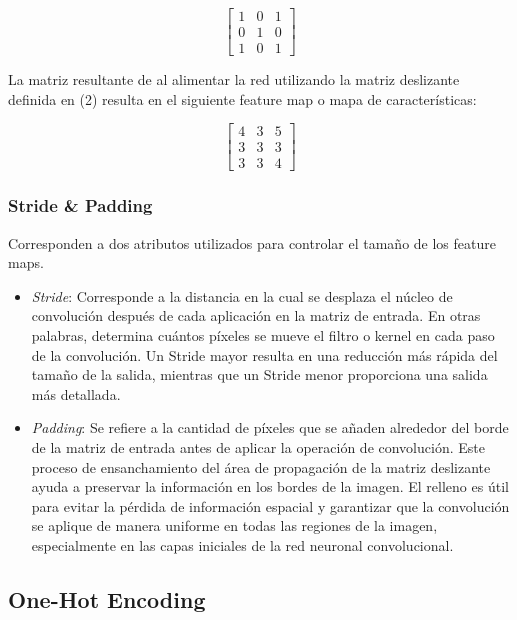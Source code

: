 \documentclass[journal]{IEEEtai}
\begin{document}
\begin{equation}
	\begin{bmatrix}
	1 & 0 & 1 \\
	0 & 1 & 0 \\
	1 & 0 & 1 
	\end{bmatrix}
\end{equation}

\hfill \break
La matriz resultante de al alimentar la red utilizando la matriz deslizante definida en (2) resulta en el siguiente feature map o mapa de características:

\begin{equation}
	\begin{bmatrix}
	4 & 3 & 5 \\
	3 & 3 & 3 \\
	3 & 3 & 4
	\end{bmatrix}
\end{equation}


\subsubsection{\textbf{Stride \& Padding}}

Corresponden a dos atributos utilizados para controlar el tamaño de los feature maps.

\begin{itemize}
\item	\textit{Stride}: Corresponde a la distancia en la cual se desplaza el núcleo de convolución después de cada aplicación en la matriz de entrada. En otras palabras, determina cuántos píxeles se mueve el filtro o kernel en cada paso de la convolución. Un Stride mayor resulta en una reducción más rápida del tamaño de la salida, mientras que un Stride menor proporciona una salida más detallada.
\item	\textit{Padding}: Se refiere a la cantidad de píxeles que se añaden alrededor del borde de la matriz de entrada antes de aplicar la operación de convolución. Este proceso de ensanchamiento del área de propagación de la matriz deslizante ayuda a preservar la información en los bordes de la imagen. El relleno es útil para evitar la pérdida de información espacial y garantizar que la convolución se aplique de manera uniforme en todas las regiones de la imagen, especialmente en las capas iniciales de la red neuronal convolucional.
\end{itemize}

\subsection{One-Hot Encoding}
\end{document}
